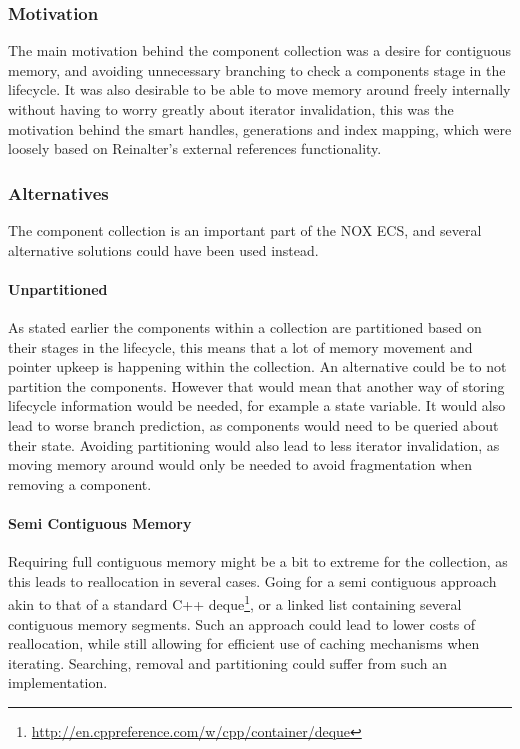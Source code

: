 \subsubsection{Motivation}
The main motivation behind the component collection was a desire for contiguous memory, and avoiding unnecessary
branching to check a components stage in the lifecycle.
It was also desirable to be able to move memory around freely internally without having to worry greatly about
iterator invalidation, this was the motivation behind the smart handles, generations and index mapping, which were loosely based
on Reinalter\cite{molecular_matters_dod_external_references}'s external references functionality.

\subsubsection{Alternatives}
The component collection is an important part of the NOX ECS, and several alternative solutions could have been used instead.

\paragraph{Unpartitioned}
As stated earlier the components within a collection are partitioned based on their stages in the lifecycle,
this means that a lot of memory movement and pointer upkeep is happening within the collection.
An alternative could be to not partition the components. However that would mean that another way of storing
lifecycle information would be needed, for example a state variable.
It would also lead to worse branch prediction, as components would need to be queried about their state.
Avoiding partitioning would also lead to less iterator invalidation, as moving memory around would
only be needed to avoid fragmentation when removing a component.

\paragraph{Semi Contiguous Memory}
Requiring full contiguous memory might be a bit to extreme for the collection, as this leads to
reallocation in several cases. Going for a semi contiguous approach akin to that of a standard C++ deque\footnote{\url{http://en.cppreference.com/w/cpp/container/deque}},
or a linked list containing several contiguous memory segments.
Such an approach could lead to lower costs of reallocation, while still allowing for efficient use of caching mechanisms
when iterating.
Searching, removal and partitioning could suffer from such an implementation.

